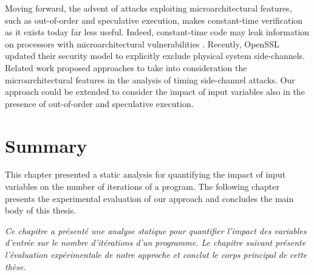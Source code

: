 Moving forward, the advent of attacks exploiting microarchitectural features, such as out-of-order and speculative execution, makes constant-time verification as it exists today far less useful.
Indeed, constant-time code may leak information on processors with microarchitectural vulnerabilities .
Recently, OpenSSL updated their security model to explicitly exclude physical system side-channels.
Related work  proposed approaches to take into consideration the microarchitectural features in the analysis of timing side-channel attacks.
Our approach could be extended to consider the impact of input variables also in the presence of out-of-order and speculative execution.


\section{Summary}

This chapter presented a static analysis for quantifying the impact of input variables on the number of iterations of a program.
The following chapter presents the experimental evaluation of our approach and concludes the main body of this thesis.


\frenchdiv

\emph{Ce chapitre a présenté une analyse statique pour quantifier l'impact des variables d'entrée sur le nombre d'itérations d'un programme. Le chapitre suivant présente l'évaluation expérimentale de notre approche et conclut le corps principal de cette thèse.}
